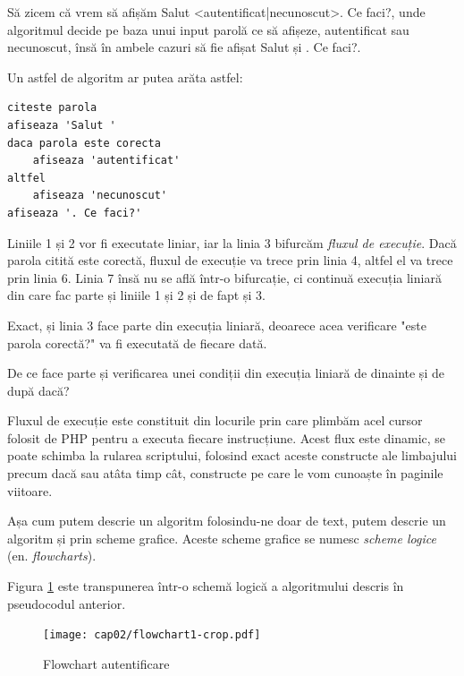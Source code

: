 Să zicem că vrem să afișăm {\glqq}Salut <autentificat|necunoscut>. Ce faci?{\grqq},
unde algoritmul decide pe baza unui input {\glqq}parolă{\grqq} ce să afișeze, {\glqq}autentificat{\grqq}
sau {\glqq}necunoscut{\grqq}, însă în ambele cazuri să fie afișat {\glqq}Salut {\grqq} și {\glqq}. Ce faci?{\grqq}.

Un astfel de algoritm ar putea arăta astfel:
\begin{lstlisting}[language=pseudocod]
citeste parola
afiseaza 'Salut '
daca parola este corecta
	afiseaza 'autentificat'
altfel
	afiseaza 'necunoscut'
afiseaza '. Ce faci?'
\end{lstlisting}

Liniile 1 și 2 vor fi executate liniar, iar la linia 3 bifurcăm \textsl{fluxul de execuție}.
Dacă parola citită este corectă, fluxul de execuție va trece prin linia 4, altfel
el va trece prin linia 6. Linia 7 însă nu se află într-o bifurcație, ci continuă
execuția liniară din care fac parte și liniile 1 și 2 și de fapt și 3.

Exact, și linia 3 face parte din execuția liniară, deoarece acea verificare "este
parola corectă?" va fi executată de fiecare dată.

\begin{Exercise}[title={Execuția liniară conține și verificarea condiției},difficulty=1]
De ce face parte și verificarea unei condiții din execuția liniară de dinainte și de după
{\glqq}dacă{\grqq}?
\end{Exercise}


Fluxul de execuție este constituit din {\glqq}locurile{\grqq} prin care plimbăm
acel {\glqq}cursor{\grqq} folosit de PHP pentru a executa fiecare instrucțiune.
Acest flux este dinamic, se poate schimba la rularea scriptului,
folosind exact aceste constructe ale limbajului precum {\glqq}dacă{\grqq} sau {\glqq}atâta timp cât{\grqq},
constructe pe care le vom cunoaște în paginile viitoare.

Așa cum putem descrie un algoritm folosindu-ne doar de text, putem
descrie un algoritm și prin scheme grafice. Aceste scheme grafice se numesc
\textit{scheme logice} (en. \textsl{flowcharts}).

Figura \ref{fig:flowchart authenticated} este transpunerea
într-o schemă logică a algoritmului descris în pseudocodul anterior.

\begin{figure}[ht!]
  \centering
    \texttt{[image: cap02/flowchart1-crop.pdf]}
  \caption{Flowchart autentificare}
  \label{fig:flowchart authenticated}
\end{figure}

